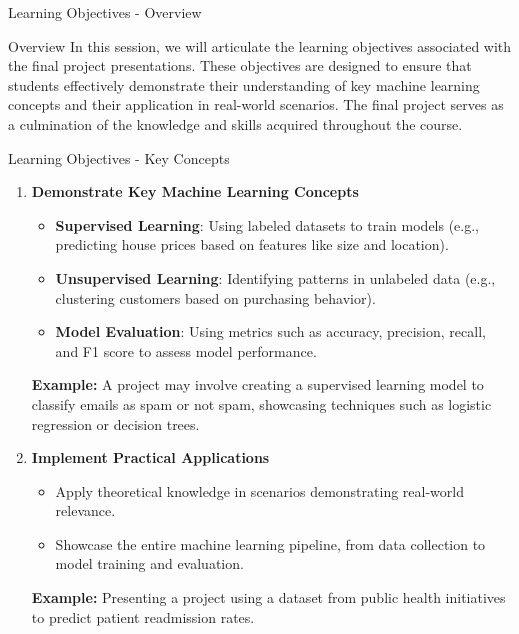 \documentclass[aspectratio=169]{beamer}
\begin{document}
\begin{frame}[fragile]{Learning Objectives - Overview}
    \begin{block}{Overview}
        In this session, we will articulate the learning objectives associated with the final project presentations. 
        These objectives are designed to ensure that students effectively demonstrate their understanding of key machine learning concepts and their application in real-world scenarios.
        The final project serves as a culmination of the knowledge and skills acquired throughout the course.
    \end{block}
\end{frame}

\begin{frame}[fragile]{Learning Objectives - Key Concepts}
    \begin{enumerate}
        \item \textbf{Demonstrate Key Machine Learning Concepts}
            \begin{itemize}
                \item \textbf{Supervised Learning}: Using labeled datasets to train models (e.g., predicting house prices based on features like size and location).
                \item \textbf{Unsupervised Learning}: Identifying patterns in unlabeled data (e.g., clustering customers based on purchasing behavior).
                \item \textbf{Model Evaluation}: Using metrics such as accuracy, precision, recall, and F1 score to assess model performance.
            \end{itemize}
            \textbf{Example:} A project may involve creating a supervised learning model to classify emails as spam or not spam, showcasing techniques such as logistic regression or decision trees.
            
        \item \textbf{Implement Practical Applications}
            \begin{itemize}
                \item Apply theoretical knowledge in scenarios demonstrating real-world relevance.
                \item Showcase the entire machine learning pipeline, from data collection to model training and evaluation.
            \end{itemize}
            \textbf{Example:} Presenting a project using a dataset from public health initiatives to predict patient readmission rates.
    \end{enumerate}
\end{frame}
\end{document}
